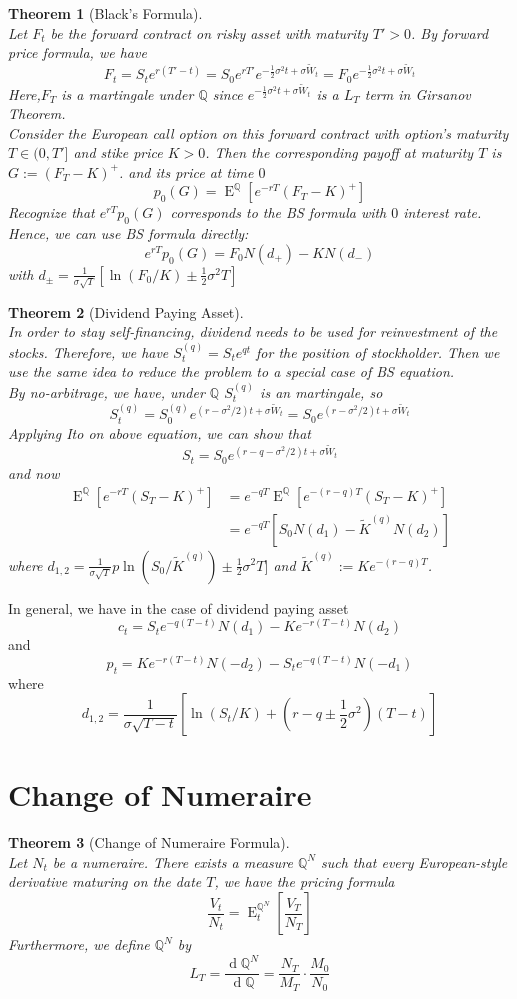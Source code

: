 \documentclass[12pt]{article}
\newtheorem{theorem}{Theorem}[section]
\theoremstyle{definition}
\DeclareMathOperator{\diff}{d}
\DeclareMathOperator{\expec}{E}
\begin{document}
\begin{theorem}[Black's Formula]
\hfill\\\normalfont Let $F_t$ be the forward contract on risky asset with maturity $T'>0$. By forward price formula, we have
\[
F_t=S_te^{r(T'-t)}=S_0 e^{rT'}e^{-\frac{1}{2}\sigma^2t+\sigma\tilde{W}_t}=F_0e^{-\frac{1}{2}\sigma^2t+\sigma\tilde{W}_t}
\]
Here,$F_T$ is a martingale under $\mathbb{Q}$ since $e^{-\frac{1}{2}\sigma^2t+\sigma\tilde{W}_t}$ is a $L_T$ term in Girsanov Theorem.\\
Consider the European call option on this forward contract with option's maturity $T\in(0,T']$ and stike price $K>0$. Then the corresponding payoff at maturity $T$ is $G:=(F_T-K)^{+}$. and its price at time $0$
\[
p_0(G)=\expec^{\mathbb{Q}}[e^{-rT}(F_T-K)^{+}]
\]
Recognize that $e^{rT}p_0(G)$ corresponds to the BS formula with $0$ interest rate. Hence, we can use BS formula directly:
\[
e^{rT}p_0(G)=F_0N(d_{+})-KN(d_{-})
\]
with $d_{\pm}=\frac{1}{\sigma\sqrt{T}}[\ln(F_0/K)\pm\frac{1}{2}\sigma^2T]$
\end{theorem}
\begin{theorem}[Dividend Paying Asset]
\hfill\\\normalfont In order to stay self-financing, dividend needs to be used for reinvestment of the stocks. Therefore, we have $S_t^{(q)}=S_te^{qt}$ for the position of stockholder. Then we use the same idea to reduce the problem to a special case of BS equation.\\
By no-arbitrage, we have, under $\mathbb{Q}$ $S_t^{(q)}$ is an martingale, so
\[
S_t^{(q)}=S_0^{(q)}e^{(r-\sigma^2/2)t+\sigma\tilde{W}_t}=S_0e^{(r-\sigma^2/2)t+\sigma\tilde{W}_t}
\]
Applying Ito on above equation, we can show that
\[
S_t=S_0e^{(r-q-\sigma^2/2)t+\sigma\tilde{W}_t}
\]
and now
\begin{align*}
\expec^{\mathbb{Q}}[e^{-rT}(S_T-K)^{+}]&=e^{-qT}\expec^{\mathbb{Q}}[e^{-(r-q)T}(S_T-K)^{+}] \\
&= e^{-qT}[S_0N(d_1)-\tilde{K}^{(q)}N(d_2)]
\end{align*}
where $d_{1,2}=\frac{1}{\sigma\sqrt{T}}p\ln(S_0/\tilde{K}^{(q)})\pm\frac{1}{2}\sigma^2T]$ and $\tilde{K}^{(q)}:=Ke^{-(r-q)T}$.
\end{theorem}
In general, we have in the case of dividend paying asset
\[
c_t=S_te^{-q(T-t)}N(d_1)-Ke^{-r(T-t)}N(d_2)
\]
and
\[
p_t=Ke^{-r(T-t)}N(-d_2)-S_te^{-q(T-t)}N(-d_1)
\]
where \[
d_{1,2}=\frac{1}{\sigma\sqrt{T-t}}[\ln(S_t/K)+(r-q\pm\frac{1}{2}\sigma^2)(T-t)]
\]

\section{Change of Numeraire}
\begin{theorem}[Change of Numeraire Formula]
\hfill\\\normalfont Let $N_t$ be a numeraire. There exists a measure $\mathbb{Q}^N$ such that every European-style derivative maturing on the date $T$, we have the pricing formula
\[
\frac{V_t}{N_t}=\expec_t^{\mathbb{Q}^N}[\frac{V_T}{N_T}]
\]
Furthermore, we define $\mathbb{Q}^N$ by 
\[
L_T=\frac{\diff \mathbb{Q}^N}{\diff\mathbb{Q}}=\frac{N_T}{M_T}\cdot\frac{M_0}{N_0}
\]
\end{theorem}
\end{document}

